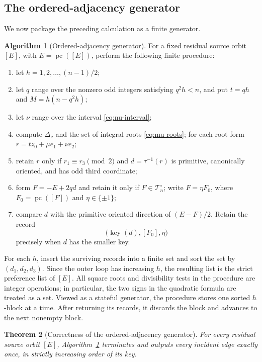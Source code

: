 \documentclass[11pt]{amsart}
\newtheorem{theorem}{Theorem}[section]
\theoremstyle{definition}
\newtheorem{algorithm}[theorem]{Algorithm}
\theoremstyle{remark}
\newcommand{\Tres}{\mathcal T_n^{\circ}}
\newcommand{\key}{\operatorname{key}}
\newcommand{\pc}{\operatorname{pc}}
\begin{document}
\subsection{The ordered-adjacency generator}

We now package the preceding calculation as a finite generator.

\begin{algorithm}[Ordered-adjacency generator]\label{alg:incident-stream}
For a fixed residual source orbit $[E]$, with $E=\pc([E])$, perform the
following finite procedure:

\begin{enumerate}
\item let $h=1,2,\ldots,(n-1)/2$;
\item let $q$ range over the nonzero odd integers satisfying $q^2h<n$, and
put $t=qh$ and $M=h(n-q^2h)$;
\item let $\nu$ range over the interval \eqref{eq:nu-interval};
\item compute $\Delta_\nu$ and the set of integral roots
\eqref{eq:mu-roots}; for each root form
$r=tz_0+\mu e_1+\nu e_2$;
\item retain $r$ only if $r_1\equiv r_3\pmod2$ and
$d=\tau^{-1}(r)$ is primitive, canonically oriented, and has odd third
coordinate;
\item form $F=-E+2qd$ and retain it only if $F\in\Tres$; write
$F=\eta F_0$, where $F_0=\pc([F])$ and $\eta\in\{\pm1\}$;
\item compare $d$ with the primitive oriented direction of $(E-F)/2$.
Retain the record
\[
 \bigl(\key(d),[F_0],\eta\bigr)
\]
precisely when $d$ has the smaller key.
\end{enumerate}

For each $h$, insert the surviving records into a finite set and sort the set
by $(d_1,d_2,d_3)$.  Since the outer loop has increasing $h$, the resulting
list is the strict preference list of $[E]$.  All square roots and divisibility
tests in the procedure are integer operations; in particular, the two signs
in the quadratic formula are treated as a set.  Viewed as a stateful generator,
the procedure stores one sorted $h$-block at a time.  After returning its
records, it discards the block and advances to the next nonempty block.
\end{algorithm}

\begin{theorem}[Correctness of the ordered-adjacency generator]
\label{thm:incident-stream}
For every residual source orbit $[E]$, Algorithm~\ref{alg:incident-stream}
terminates and outputs every incident edge exactly once, in strictly increasing
order of its key.
\end{theorem}
\end{document}

